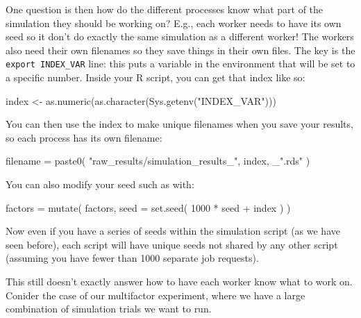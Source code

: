 \documentclass[
]{book}
\newenvironment{Shaded}{\begin{snugshade}}{\end{snugshade}}
\newcommand{\AttributeTok}[1]{\textcolor[rgb]{0.77,0.63,0.00}{#1}}
\newcommand{\DecValTok}[1]{\textcolor[rgb]{0.00,0.00,0.81}{#1}}
\newcommand{\FunctionTok}[1]{\textcolor[rgb]{0.00,0.00,0.00}{#1}}
\newcommand{\NormalTok}[1]{#1}
\newcommand{\OtherTok}[1]{\textcolor[rgb]{0.56,0.35,0.01}{#1}}
\newcommand{\SpecialCharTok}[1]{\textcolor[rgb]{0.00,0.00,0.00}{#1}}
\newcommand{\StringTok}[1]{\textcolor[rgb]{0.31,0.60,0.02}{#1}}
\begin{document}
One question is then how do the different processes know what part of the simulation they should be working on?
E.g., each worker needs to have its own seed so it don't do exactly the same simulation as a different worker!
The workers also need their own filenames so they save things in their own files.
The key is the \texttt{export\ INDEX\_VAR} line: this puts a variable in the environment that will be set to a specific number.
Inside your R script, you can get that index like so:

\begin{Shaded}
\begin{Highlighting}[]
\NormalTok{index }\OtherTok{\textless{}{-}} \FunctionTok{as.numeric}\NormalTok{(}\FunctionTok{as.character}\NormalTok{(}\FunctionTok{Sys.getenv}\NormalTok{(}\StringTok{"INDEX\_VAR"}\NormalTok{)))}
\end{Highlighting}
\end{Shaded}

You can then use the index to make unique filenames when you save your results, so each process has its own filename:

\begin{Shaded}
\begin{Highlighting}[]
\NormalTok{filename }\OtherTok{=} \FunctionTok{paste0}\NormalTok{( }\StringTok{"raw\_results/simulation\_results\_"}\NormalTok{, index, \_}\StringTok{".rds"}\NormalTok{ )}
\end{Highlighting}
\end{Shaded}

You can also modify your seed such as with:

\begin{Shaded}
\begin{Highlighting}[]
\NormalTok{factors }\OtherTok{=} \FunctionTok{mutate}\NormalTok{( factors,}
                  \AttributeTok{seed =} \FunctionTok{set.seed}\NormalTok{( }\DecValTok{1000} \SpecialCharTok{*}\NormalTok{ seed }\SpecialCharTok{+}\NormalTok{ index ) )}
\end{Highlighting}
\end{Shaded}

Now even if you have a series of seeds within the simulation script (as we have seen before), each script will have unique seeds not shared by any other script (assuming you have fewer than 1000 separate job requests).

This still doesn't exactly answer how to have each worker know what to work on.
Conider the case of our multifactor experiment, where we have a large combination of simulation trials we want to run.
\end{document}
